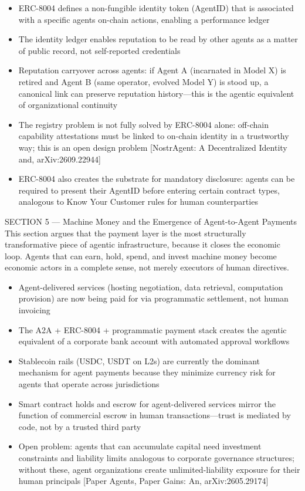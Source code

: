 \documentclass[
]{article}
\providecommand{\tightlist}{%
  \setlength{\itemsep}{0pt}\setlength{\parskip}{0pt}}
\begin{document}
\begin{itemize}
\tightlist
\item
  ERC-8004 defines a non-fungible identity token (AgentID) that is
  associated with a specific agent\textquotesingle s on-chain actions,
  enabling a performance ledger
\item
  The identity ledger enables reputation to be read by other agents as a
  matter of public record, not self-reported credentials
\item
  Reputation carryover across agents: if Agent A (incarnated in Model X)
  is retired and Agent B (same operator, evolved Model Y) is stood up, a
  canonical link can preserve reputation history---this is the agentic
  equivalent of organizational continuity
\item
  The registry problem is not fully solved by ERC-8004 alone: off-chain
  capability attestations must be linked to on-chain identity in a
  trustworthy way; this is an open design problem {[}NostrAgent: A
  Decentralized Identity and, arXiv:2609.22944{]}
\item
  ERC-8004 also creates the substrate for mandatory disclosure: agents
  can be required to present their AgentID before entering certain
  contract types, analogous to Know Your Customer rules for human
  counterparties
\end{itemize}

SECTION 5 --- Machine Money and the Emergence of Agent-to-Agent Payments
This section argues that the payment layer is the most structurally
transformative piece of agentic infrastructure, because it closes the
economic loop. Agents that can earn, hold, spend, and invest machine
money become economic actors in a complete sense, not merely executors
of human directives.

\begin{itemize}
\tightlist
\item
  Agent-delivered services (hosting negotiation, data retrieval,
  computation provision) are now being paid for via programmatic
  settlement, not human invoicing
\item
  The A2A + ERC-8004 + programmatic payment stack creates the agentic
  equivalent of a corporate bank account with automated approval
  workflows
\item
  Stablecoin rails (USDC, USDT on L2s) are currently the dominant
  mechanism for agent payments because they minimize currency risk for
  agents that operate across jurisdictions
\item
  Smart contract holds and escrow for agent-delivered services mirror
  the function of commercial escrow in human transactions---trust is
  mediated by code, not by a trusted third party
\item
  Open problem: agents that can accumulate capital need investment
  constraints and liability limits analogous to corporate governance
  structures; without these, agent organizations create
  unlimited-liability exposure for their human principals {[}Paper
  Agents, Paper Gains: An, arXiv:2605.29174{]}
\end{itemize}
\end{document}
